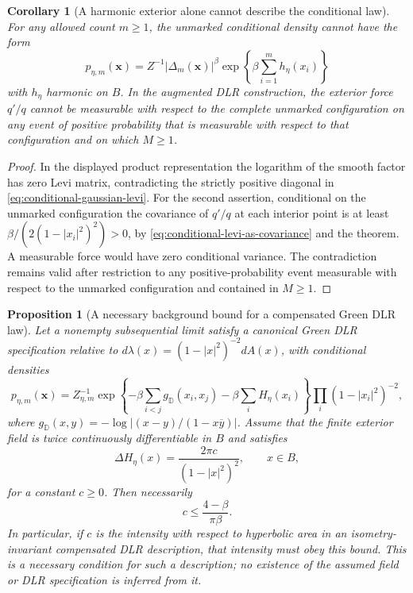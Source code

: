 \documentclass[11pt,a4paper]{article}
\numberwithin{equation}{section}
\newtheorem{proposition}[theorem]{Proposition}
\newtheorem{corollary}[theorem]{Corollary}
\theoremstyle{definition}
\theoremstyle{remark}
\newcommand{\D}{\mathbb D}
\begin{document}
\begin{corollary}[A harmonic exterior alone cannot describe the conditional law]
\label{cor:no-pure-harmonic-unmarked-dlr}
For any allowed count $m\ge1$, the unmarked conditional density cannot
have the form
\[
 p_{\eta,m}(\mathbf x)
   =Z^{-1}|\Delta_m(\mathbf x)|^\beta
             \exp\left\{\beta\sum_{i=1}^m h_\eta(x_i)\right\}
\]
with $h_\eta$ harmonic on $B$. In the augmented DLR construction,
the exterior force $q'/q$ cannot be measurable with respect to the
complete unmarked configuration on any event of positive probability
that is measurable with respect to that configuration and on which
$M\ge1$.
\end{corollary}

\begin{proof}
In the displayed product representation the logarithm of the smooth
factor has zero Levi matrix, contradicting the strictly positive
diagonal in \eqref{eq:conditional-gaussian-levi}. For the second
assertion, conditional on the unmarked configuration the covariance
of $q'/q$ at each interior point is at least
$\beta/(2(1-|x_i|^2)^2)>0$, by
\eqref{eq:conditional-levi-as-covariance} and the theorem. A measurable
force would have zero conditional variance. The contradiction remains
valid after restriction to any positive-probability event measurable
with respect to the unmarked configuration and contained in $M\ge1$.
\end{proof}

\begin{proposition}[A necessary background bound for a compensated Green DLR law]
\label{prop:conditional-green-background-bound}
Let a nonempty subsequential limit satisfy a canonical Green DLR
specification relative to
$d\lambda(x)=(1-|x|^2)^{-2}dA(x)$, with conditional densities
\begin{equation}\label{eq:canonical-green-density-for-bound}
 p_{\eta,m}(\mathbf x)
  =Z_{\eta,m}^{-1}
    \exp\left\{-\beta\sum_{i<j}g_{\D}(x_i,x_j)
                   -\beta\sum_i H_\eta(x_i)\right\}
                   \prod_i(1-|x_i|^2)^{-2},
\end{equation}
where
$g_{\D}(x,y)=-\log|(x-y)/(1-x\overline y)|$.
Assume that the finite exterior field is twice continuously
differentiable in $B$ and satisfies
\[
 \Delta H_\eta(x)=\frac{2\pi c}{(1-|x|^2)^2},
 \qquad x\in B,
\]
for a constant $c\ge0$. Then necessarily
\begin{equation}\label{eq:green-background-density-bound}
 c\le\frac{4-\beta}{\pi\beta}.
\end{equation}
In particular, if $c$ is the intensity with respect to hyperbolic
area in an isometry-invariant compensated DLR description, that
intensity must obey this bound. This is a necessary condition for
such a description; no existence of the assumed field or DLR
specification is inferred from it.
\end{proposition}
\end{document}
